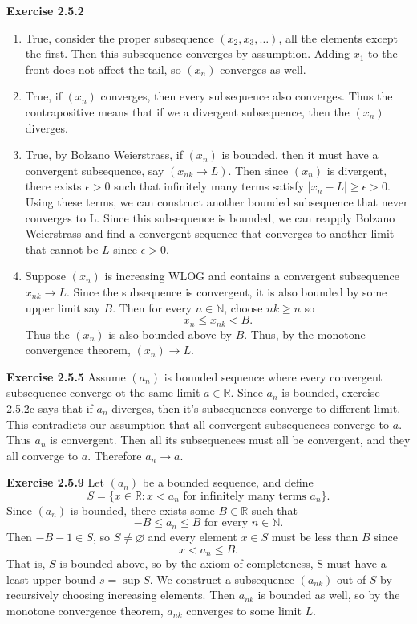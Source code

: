 \documentclass[12pt]{article}
\begin{document}
\textbf{Exercise 2.5.2}
\begin{enumerate}[label=(\alph*)]
    \item True, consider the proper subsequence \( (x_2, x_3, \dots) \), all the elements except the first.
          Then this subsequence converges by assumption. Adding \( x_1 \) to the front does not affect the tail, so \( (x_n) \)
          converges as well.
    \item True, if \( (x_n) \) converges, then every subsequence also converges. Thus the contrapositive means that if we a divergent subsequence, then the \( (x_n) \) diverges.
    \item True, by Bolzano Weierstrass, if \( (x_n) \) is bounded,
          then it must have a convergent subsequence, say \( (x_{nk} \to L) \).
          Then since \( (x_n) \) is divergent, there exists \( \epsilon > 0 \)
          such that infinitely many terms satisfy \( \vert x_n - L \vert \geq \epsilon > 0 \).
          Using these terms, we can construct another bounded subsequence that never converges to L.
          Since this subsequence is bounded, we can reapply Bolzano Weierstrass
          and find a convergent sequence that converges to
          another limit that cannot be \( L \) since \( \epsilon > 0 \).

    \item Suppose \( (x_n) \) is increasing WLOG and contains a convergent subsequence \( x_{nk} \to L \).
          Since the subsequence is convergent, it is also bounded by some upper limit say \( B \).
          Then for every \( n \in \mathbb{N} \), choose \( nk \geq n \) so
          \[
              x_n \leq x_{nk} < B.
          \]
          Thus the \( (x_n) \) is also bounded above by \( B \). Thus, by the monotone convergence theorem, \( (x_n) \to L\).
\end{enumerate}

\textbf{Exercise 2.5.5}
Assume \( (a_n) \) is bounded sequence where every convergent subsequence converge ot the same limit \( a \in \mathbb{R} \).
Since \( a_n \) is bounded, exercise 2.5.2c says that if \( a_n \) diverges, then it's subsequences converge to different limit.
This contradicts our assumption that all convergent subsequences converge to \( a \). Thus \( a_n \) is convergent.
Then all its subsequences must all be convergent, and they all converge to \( a \). Therefore \( a_n \to a \).

\textbf{Exercise 2.5.9}
Let \( (a_n) \) be a bounded sequence, and define
\[
    S = \{x \in \mathbb{R} : x < a_n \text{ for infinitely many terms } a_n\}.
\]
Since \( (a_n) \) is bounded,  there exists some \( B \in \mathbb{R} \) such that
\[
    -B \leq a_n \leq B \text{ for every } n \in \mathbb{N}.
\]
Then \( -B-1 \in S\), so \( S \neq \varnothing  \) and every element \( x \in S \) must be less than \( B \) since
\[
    x < a_n \leq B.
\]
That is, \( S \) is bounded above, so by the axiom of completeness, S must have a least upper bound \( s =\sup S \).
We construct a subsequence \( (a_{nk}) \) out of \( S \) by recursively choosing increasing elements.
Then \( a_{nk} \) is bounded as well, so by the monotone convergence theorem, \( a_{nk} \) converges to some limit \( L \).
\end{document}
